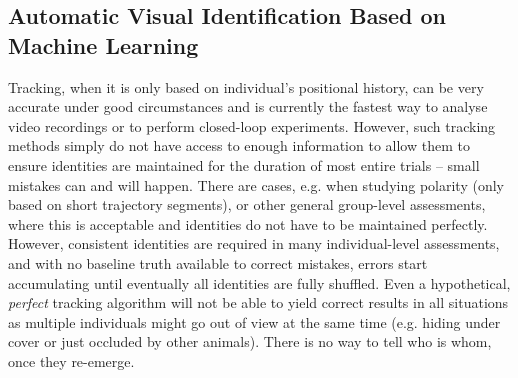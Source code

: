 \documentclass[9pt,lineno]{elife}
\begin{document}
\subsection{Automatic Visual Identification Based on Machine Learning} \label{sec:visual_recognition}

Tracking, when it is only based on individual's positional history, can be very accurate under good circumstances and is currently the fastest way to analyse video recordings or to perform closed-loop experiments. However, such tracking methods simply do not have access to enough information to allow them to ensure identities are maintained for the duration of most entire trials -- small mistakes can and will happen. There are cases, e.g. when studying polarity (only based on short trajectory segments), or other general group-level assessments, where this is acceptable and identities do not have to be maintained perfectly. However, consistent identities are required in many individual-level assessments, and with no baseline truth available to correct mistakes, errors start accumulating until eventually all identities are fully shuffled. Even a hypothetical, \emph{perfect} tracking algorithm will not be able to yield correct results in all situations as multiple individuals might go out of view at the same time (e.g. hiding under cover or just occluded by other animals). There is no way to tell who is whom, once they re-emerge.
\end{document}
